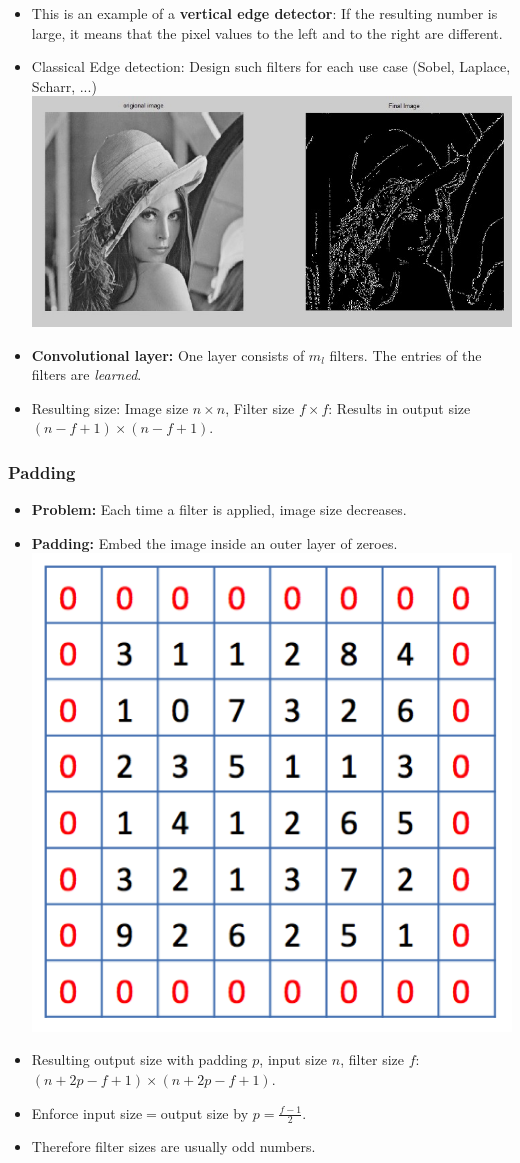 \documentclass[10pt,hyperref={pdfpagelabels=false}]{beamer}
\begin{document}
\begin{frame}[allowframebreaks]
\begin{itemize}
        \item
        This is an example of a {\bf vertical edge detector}: If the resulting number is large, it means that the pixel values to the left and to the right are different.
        \framebreak
        \item Classical Edge detection: Design such filters for each use case (Sobel, Laplace, Scharr, ...)
        \includegraphics[width=.8\textwidth]{figures/sobel.jpg}
        \item {\bf Convolutional layer:} One layer consists of $m_l$ filters. The entries of the filters are \emph{learned}.
        \item Resulting size: Image size $n\times n$, Filter size $f\times f$: Results in output size $(n-f+1)\times (n-f+1)$.
    \end{itemize}
\end{frame}
\begin{frame}
    \frametitle{Padding}
    \begin{itemize}
        \item {\bf Problem:} Each time a filter is applied, image size decreases.
        \item {\bf Padding:} Embed the image inside an outer layer of zeroes.
        \includegraphics[width=.3\textwidth]{figures/padding.png}
        \item Resulting output size with padding $p$, input size $n$, filter size $f$:  $(n+2p-f+1)\times (n+2p-f+1)$.
        \item Enforce input size$=$output size by $p=\frac{f-1}{2}$.
        \item Therefore filter sizes are usually odd numbers.
    \end{itemize}
\end{frame}
\end{document}
